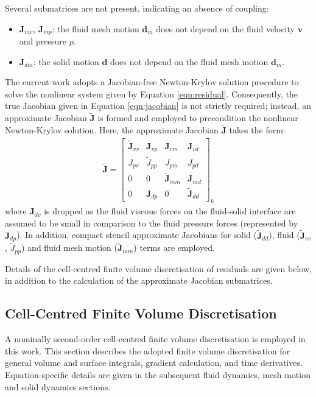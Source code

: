 \documentclass[sn-mathphys,Numbered]{sn-jnl}%
\newcommand{\bb}{\boldsymbol}
\begin{document}
Several submatrices are not present, indicating an absence of coupling:
\begin{itemize}
	\item $\bb{J}_{mv}$, $\bb{J}_{mp}$: the fluid mesh motion $\bb{d}_m$ does not depend on the fluid velocity $\bb{v}$ and pressure $p$.
	\item $\bb{J}_{dm}$: the solid motion $\bb{d}$ does not depend on the fluid mesh motion $\bb{d}_m$. 
\end{itemize}

The current work adopts a Jacobian-free Newton-Krylov solution procedure \citep{Cardiff2025JFNK} to solve the nonlinear system given by Equation \ref{eqn:residual}.
Consequently, the true Jacobian given in Equation \ref{eqn:jacobian} is not strictly required; instead, an approximate Jacobian $\tilde{\bb{J}}$ is formed and employed to precondition the nonlinear Newton-Krylov solution.
Here, the approximate Jacobian $\tilde{\bb{J}}$ takes the form:
\begin{eqnarray} \label{eqn:approx_jacobian}
\tilde{\bb{J}} =
\begin{bmatrix}
\tilde{\bb{J}}_{vv} & \bb{J}_{vp} & \bb{J}_{vm} & \bb{J}_{vd} \\
J_{pv} & \tilde{J}_{pp} & J_{pm} & J_{pd} \\
0 & 0 & \tilde{\bb{J}}_{mm} & \bb{J}_{md} \\
0 & \bb{J}_{dp} & 0 & \tilde{\bb{J}}_{dd}
\end{bmatrix}_k
\end{eqnarray}
where $\bb{J}_{dv}$ is dropped as the fluid viscous forces on the fluid-solid interface are assumed to be small in comparison to the fluid pressure forces (represented by $\bb{J}_{dp}$).
In addition, compact stencil approximate Jacobians for solid ($\tilde{\bb{J}}_{dd}$), fluid ($\tilde{\bb{J}}_{vv}$, $\tilde{J}_{pp}$) and fluid mesh motion ($\tilde{\bb{J}}_{mm}$) terms are employed.

Details of the cell-centred finite volume discretisation of residuals are given below, in addition to the calculation of the approximate Jacobian submatrices.




\subsection{Cell-Centred Finite Volume Discretisation}
A nominally second-order cell-centred finite volume discretisation is employed in this work.
This section describes the adopted finite volume discretisation for general volume and surface integrals, gradient calculation, and time derivatives.
Equation-specific details are given in the subsequent fluid dynamics, mesh motion and solid dynamics sections.
\end{document}
